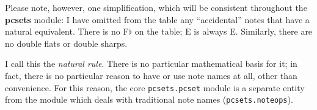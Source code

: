 \documentclass[letterpaper,12pt,oneside]{book}
\begin{document}
Please note, however, one simplification, which will be consistent
throughout the {\bf pcsets} module: I have omitted from the table
any ``accidental'' notes that have a natural equivalent. There is no
F$\flat$ on the table; E is always E. Similarly, there are no double
flats or double sharps.

I call this the {\em natural rule}.  There is no particular mathematical basis for it; in fact, there
is no particular reason to have or use note names at all, other than
convenience. For this reason, the core \lstinline{pcsets.pcset} module
is a separate entity from the module which deals with traditional note
names (\lstinline{pcsets.noteops}).


\begin{comment} %

\section{Pitch Class Sets}

Text.

\subsection{Definition}

Text.

\subsubsection{Components}

Text.

\subsubsection{Unique Membership}

Text.

\subsubsection{Unordered Set}

Text.

\subsection{Set Names}

Text.

\subsubsection{Special Sets}


\end{comment}
\end{document}
